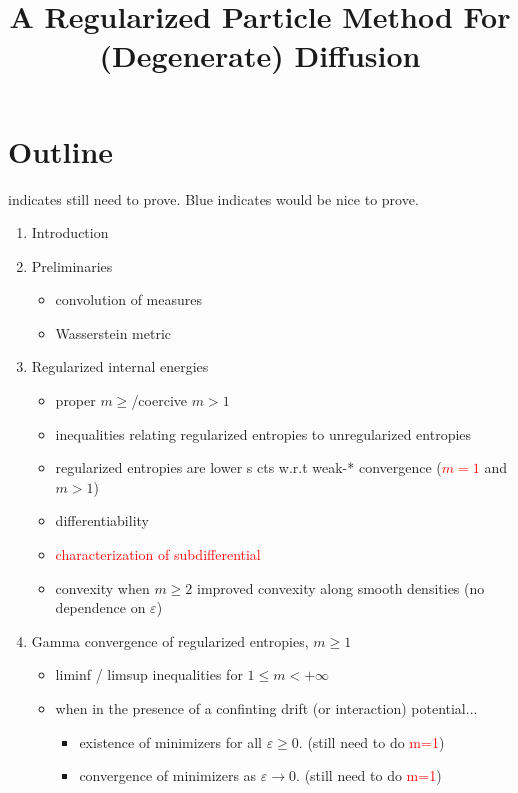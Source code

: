 \documentclass[11pt,leqno]{amsart}
\title{A Regularized Particle Method For (Degenerate) Diffusion}
\theoremstyle{definition}
\def\epsilon{\varepsilon}
\def\e{\varepsilon}
\begin{document}
\maketitle 


\section*{Outline}
 indicates still need to prove. {\color{blue} Blue} indicates would be nice to prove. \\

\begin{enumerate}[1)]
\item Introduction
\item Preliminaries
\begin{itemize}
\item convolution of measures
\item Wasserstein metric
\end{itemize}
\item Regularized internal energies
\begin{itemize}
\item proper $m \geq $/coercive $m >1$
\item inequalities relating regularized entropies to unregularized entropies
\item regularized entropies are lower s cts w.r.t weak-* convergence (\textcolor{red}{$m=1$} and $m>1$)
\item differentiability
\item \textcolor{red}{characterization of subdifferential}
\item convexity when $m\geq2$ {\color{blue} improved convexity along smooth densities (no dependence on $\epsilon$)}
\end{itemize}
\item Gamma convergence of regularized entropies, $m \geq 1$
\begin{itemize}
\item liminf / limsup inequalities for $1\leq m < +\infty$
\item when in the presence of a confinting drift (or interaction) potential...
\begin{itemize}
\item existence of minimizers for all $\e \geq 0$. (still need to do \textcolor{red}{m=1})
\item convergence of minimizers as $\e \to 0$. (still need to do \textcolor{red}{m=1})
\end{itemize}

\end{itemize}
\end{enumerate}
\end{document}
